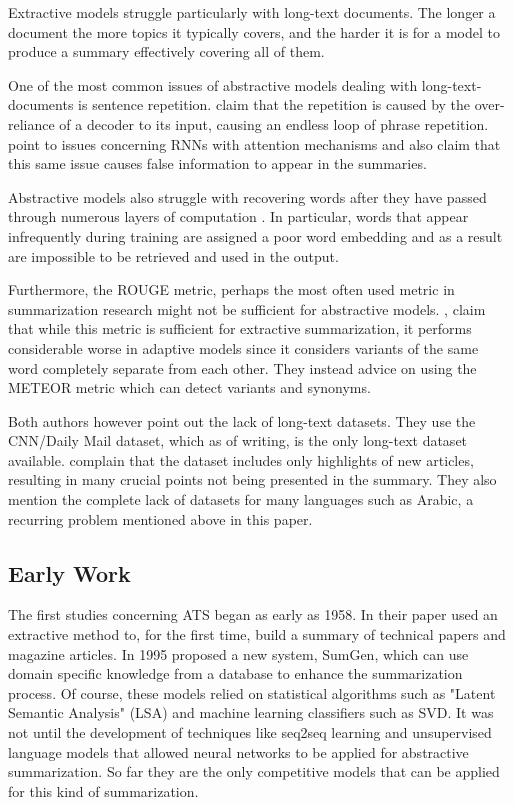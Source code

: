 \documentclass{article}
\begin{document}
	Extractive models struggle particularly with long-text documents\cite{xiao}. The longer a document the more topics it typically covers, and the harder it is for a model to produce a summary effectively covering all of them.\par
	
	One of the most common issues of abstractive models dealing with long-text-documents is sentence repetition. \textcite{abigail} claim that the repetition is caused by the over-reliance of a decoder to its input, causing an endless loop of phrase repetition. \textcite{suleiman} point to issues concerning RNNs with attention mechanisms and also claim that this same issue causes false information to appear in the summaries. \par
	
	Abstractive models also struggle with recovering words after they have passed through numerous layers of computation \textcite{abigail}. In particular, words that appear infrequently during training are assigned a poor word embedding and as a result are impossible to be retrieved and used in the output. \par 
	
	Furthermore, the ROUGE metric, perhaps the most often used metric in summarization research might not be sufficient for abstractive models. \textcite{suleiman}, claim that while this metric is sufficient for extractive summarization, it performs considerable worse in adaptive models since it considers variants of the same word completely separate from each other. They instead advice on using the METEOR metric which can detect variants and synonyms. \par
	
	Both authors however point out the lack of long-text datasets. They use the CNN/Daily Mail dataset, which as of writing, is the only long-text dataset available. \textcite{suleiman} complain that the dataset includes only highlights of new articles, resulting in many crucial points not being presented in the summary. They also mention the complete lack of datasets for many languages such as Arabic, a recurring problem mentioned above in this paper. \par
	
	
	\subsection{Early Work}
	
	The first studies concerning ATS began as early as 1958. In their paper \textcite{luhn} used an extractive method to, for the first time, build a summary  of technical papers and magazine articles. In 1995 \textcite{maybury} proposed a new system, SumGen, which can use domain specific knowledge from a database to enhance the summarization process. Of course, these models relied on statistical algorithms such as "Latent Semantic Analysis" (LSA) and machine learning classifiers such as SVD. It was not until the development of techniques like seq2seq learning and unsupervised language models that allowed neural networks to be applied for abstractive summarization. So far they are the only competitive models that can be applied for this kind of summarization.
	
\end{document}
